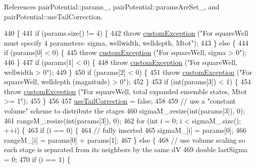 References pair\-Potential\-::params\-\_\-, pair\-Potential\-::params\-Are\-Set\-\_\-, and pair\-Potential\-::use\-Tail\-Correction.


\begin{DoxyCode}
440                                                                  \{
441     \textcolor{keywordflow}{if} (params.size() != 4) \{
442         \textcolor{keywordflow}{throw} \hyperlink{classcustom_exception}{customException} (\textcolor{stringliteral}{"For squareWell must specify 4 parameters: sigma, wellwidth,
       welldepth, Mtot"});
443     \} \textcolor{keywordflow}{else} \{
444         \textcolor{keywordflow}{if} (params[0] < 0) \{
445             \textcolor{keywordflow}{throw} \hyperlink{classcustom_exception}{customException} (\textcolor{stringliteral}{"For squareWell, sigma > 0"});
446         \}
447         \textcolor{keywordflow}{if} (params[1] < 0) \{
448             \textcolor{keywordflow}{throw} \hyperlink{classcustom_exception}{customException} (\textcolor{stringliteral}{"For squareWell, wellwidth > 0"});
449         \}
450         \textcolor{keywordflow}{if} (params[2] < 0) \{
451             \textcolor{keywordflow}{throw} \hyperlink{classcustom_exception}{customException} (\textcolor{stringliteral}{"For squareWell, welldepth (magnitude) > 0"});
452         \}
453         \textcolor{keywordflow}{if} (\textcolor{keywordtype}{int}(params[3]) < 1) \{
454             \textcolor{keywordflow}{throw} \hyperlink{classcustom_exception}{customException} (\textcolor{stringliteral}{"For squareWell, total expanded ensemble states, Mtot >=
       1"});
455         \}
456 
457         \hyperlink{classpair_potential_ab4b4538a7e13771f50a29aaac2443037}{useTailCorrection} = \textcolor{keyword}{false};
458 
459         \textcolor{comment}{// use a "constant volume" scheme to distribute the stages}
460         sigmaM\_.resize(\textcolor{keywordtype}{int}(params[3]), 0);
461         rangeM\_.resize(\textcolor{keywordtype}{int}(params[3]), 0);
462         \textcolor{keywordflow}{for} (\textcolor{keywordtype}{int} i = 0; i < sigmaM\_.size(); ++i) \{
463             \textcolor{keywordflow}{if} (i == 0) \{
464                 \textcolor{comment}{// fully inserted}
465                 sigmaM\_[i] = params[0];
466                 rangeM\_[i] = params[0] + params[1];
467             \} \textcolor{keywordflow}{else} \{
468                 \textcolor{comment}{// use volume scaling so each stage is separated from its neighbors by the same dV}
469                 \textcolor{keywordtype}{double} lastSigma = 0;
470                 \textcolor{keywordflow}{if} (i == 1) \{

\end{DoxyCode}
